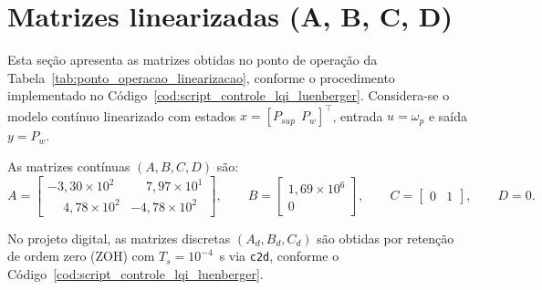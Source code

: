 \section{Matrizes linearizadas (A, B, C, D)}
\label{ap:matrizes-lin}

Esta seção apresenta as matrizes obtidas no ponto de operação da Tabela~\ref{tab:ponto_operacao_linearizacao}, conforme o procedimento implementado no Código~\ref{cod:script_controle_lqi_luenberger}. Considera-se o modelo contínuo linearizado com estados $x=[P_{sup}\ \ P_w]^\top$, entrada $u=\omega_p$ e saída $y=P_w$.

As matrizes contínuas $(A,B,C,D)$ são:
\begin{equation}
    A =
    \begin{bmatrix}
        -3{,}30\times 10^{2}            & \phantom{-}7{,}97\times 10^{1} \\
        \phantom{-}4{,}78\times 10^{2} & -4{,}78\times 10^{2}
    \end{bmatrix},
    \qquad
    B =
    \begin{bmatrix}
        1{,}69\times 10^{6} \\
        0
    \end{bmatrix},
    \qquad
    C =
    \begin{bmatrix}
        0 & 1
    \end{bmatrix},
    \qquad
    D = 0.
\end{equation}

No projeto digital, as matrizes discretas $(A_d,B_d,C_d)$ são obtidas por retenção de ordem zero (ZOH) com $T_s=10^{-4}$~s via \texttt{c2d}, conforme o Código~\ref{cod:script_controle_lqi_luenberger}.





